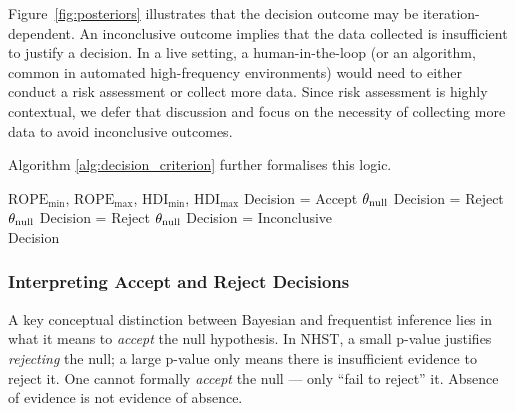 Figure~\ref{fig:posteriors} illustrates that the decision outcome may be iteration-dependent. An inconclusive outcome implies that the data collected is insufficient to justify a decision. In a live setting, a human-in-the-loop (or an algorithm, common in automated high-frequency environments) would need to either conduct a risk assessment or collect more data. Since risk assessment is highly contextual, we defer that discussion and focus on the necessity of collecting more data to avoid inconclusive outcomes.

Algorithm \ref{alg:decision_criterion} further formalises this logic.

\begin{algorithm}
    \caption{The Decision Rule}\label{alg:decision_criterion}
    \begin{algorithmic}
    \Require $\mathrm{ROPE}_\mathrm{min}$, $\mathrm{ROPE}_\mathrm{max}$, $\mathrm{HDI}_\mathrm{min}$, $\mathrm{HDI}_\mathrm{max}$
        \State Decision = Accept $\theta_{\rm null}$ 
        \State Decision = Reject $\theta_{\rm null}$ 
        \State Decision = Reject $\theta_{\rm null}$ 
    \Else
    \State Decision = Inconclusive  
    \EndIf \\
    \Return Decision
    \end{algorithmic} 
\end{algorithm}

\subsubsection{Interpreting Accept and Reject Decisions}\label{sec:accept_reject_meaning}

A key conceptual distinction between Bayesian and frequentist inference lies in what it
means to \textit{accept} the null hypothesis. In NHST, a small p-value justifies
\textit{rejecting} the null; a large p-value only means there is insufficient evidence
to reject it. One cannot formally \textit{accept} the null --- only ``fail to reject''
it. Absence of evidence is not evidence of absence.


